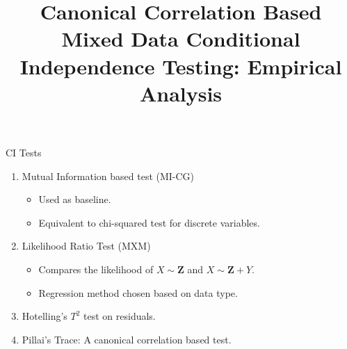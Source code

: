 \documentclass{beamer}
\begin{document}
\title[]{Canonical Correlation Based Mixed Data Conditional Independence Testing: Empirical Analysis}
\author{}
\date{}

\maketitle

\begin{frame}{CI Tests}
	\begin{enumerate}
		\item Mutual Information based test (MI-CG) \footnotemark
			\begin{itemize}
				\item Used as baseline.
				\item Equivalent to chi-squared test for discrete variables.
			\end{itemize}
		\item Likelihood Ratio Test (MXM) \footnotemark
			\begin{itemize}
				\item Compares the likelihood of $ X \sim \bm{Z} $ and $ X \sim \bm{Z} + Y $.
				\item Regression method chosen based on data type.
			\end{itemize}
		\item Hotelling's $T^2$ test on residuals. \footnotemark
		\item Pillai's Trace: A canonical correlation based test.
	\end{enumerate}


\end{frame}
\end{document}
